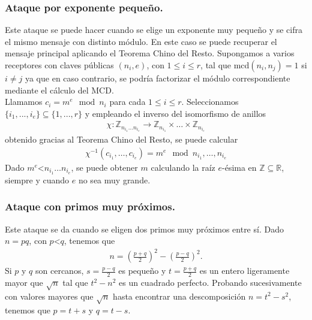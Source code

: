 	\subsubsection{Ataque por exponente pequeño.}
	Este ataque se puede hacer cuando se elige un exponente muy pequeño y se cifra el mismo mensaje con distinto módulo. En este caso se puede recuperar el mensaje principal aplicando el Teorema Chino del Resto. Supongamos a varios receptores con claves públicas $(n_i, e)$, con $1\leq i \leq r$, tal que mcd$(n_i, n_j) = 1$ si $i\neq j$ ya que en caso contrario, se podría factorizar el módulo correspondiente mediante el cálculo del MCD.\\
	Llamamos $c_i = m^e \mod n_i$ para cada $1\leq i \leq r$. Seleccionamos $\{i_1,...,i_e \}\subseteq \{1,...,r\}$ y empleando el inverso del isomorfismo de anillos
	\begin{align*}
		\chi:\mathbb{Z}_{n_{i_1}\dots n_{i_e}}\rightarrow \mathbb{Z}_{n_{i_1}}\times \dots \times \mathbb{Z}_{n_{i_e}}
	\end{align*}
	obtenido gracias al Teorema Chino del Resto, se puede calcular
	\begin{align*}
		\chi^{-1}(c_{i_1},\dots,c_{i_e}) = m^e \mod n_{i_1},\dots,n_{i_e}
	\end{align*}
	Dado $m^e$\textless $n_{i_1}\dots n_{i_e}$, se puede obtener $m$ calculando la raíz $e$-ésima en $\mathbb{Z} \subseteq \mathbb{R}$, siempre y cuando $e$ no sea muy grande.

	\subsubsection{Ataque con primos muy próximos.}
	Este ataque se da cuando se eligen dos primos muy próximos entre sí. Dado $n=pq$, con $p$\textless $q$, tenemos que  
	\begin{align*}
			n=\left (\frac{p+q}{2}\right )^2-\left (\frac{p-q}{2}\right )^2.
	\end{align*}
	Si $p$ y $q$ son cercanos, $s=\frac{p-q}{2}$ es pequeño y $t=\frac{p+q}{2}$ es un entero ligeramente mayor que $\sqrt{n}$ tal que $t^2 - n^2$ es un cuadrado perfecto. Probando sucesivamente con valores mayores que $\sqrt{n}$ hasta encontrar una descomposición $n=t^2-s^2$, tenemos que $p=t+s$ y $q=t-s$.

